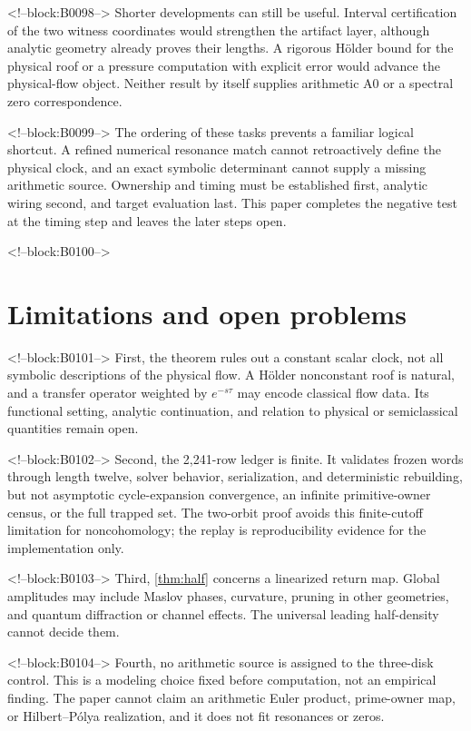 \documentclass[11pt,a4paper]{article}
\theoremstyle{definition}
\theoremstyle{remark}
\begin{document}
<!--block:B0098-->
Shorter developments can still be useful. Interval certification of the two witness coordinates would strengthen the artifact layer, although analytic geometry already proves their lengths. A rigorous Hölder bound for the physical roof or a pressure computation with explicit error would advance the physical-flow object. Neither result by itself supplies arithmetic A0 or a spectral zero correspondence.

<!--block:B0099-->
The ordering of these tasks prevents a familiar logical shortcut. A refined numerical resonance match cannot retroactively define the physical clock, and an exact symbolic determinant cannot supply a missing arithmetic source. Ownership and timing must be established first, analytic wiring second, and target evaluation last. This paper completes the negative test at the timing step and leaves the later steps open.

<!--block:B0100-->
\section{Limitations and open problems}

<!--block:B0101-->
First, the theorem rules out a constant scalar clock, not all symbolic descriptions of the physical flow. A Hölder nonconstant roof is natural, and a transfer operator weighted by \(e^{-s\tau}\) may encode classical flow data. Its functional setting, analytic continuation, and relation to physical or semiclassical quantities remain open.

<!--block:B0102-->
Second, the 2,241-row ledger is finite. It validates frozen words through length twelve, solver behavior, serialization, and deterministic rebuilding, but not asymptotic cycle-expansion convergence, an infinite primitive-owner census, or the full trapped set. The two-orbit proof avoids this finite-cutoff limitation for noncohomology; the replay is reproducibility evidence for the implementation only.

<!--block:B0103-->
Third, \cref{thm:half} concerns a linearized return map. Global amplitudes may include Maslov phases, curvature, pruning in other geometries, and quantum diffraction or channel effects. The universal leading half-density cannot decide them.

<!--block:B0104-->
Fourth, no arithmetic source is assigned to the three-disk control. This is a modeling choice fixed before computation, not an empirical finding. The paper cannot claim an arithmetic Euler product, prime-owner map, or Hilbert--Pólya realization, and it does not fit resonances or zeros.
\end{document}
